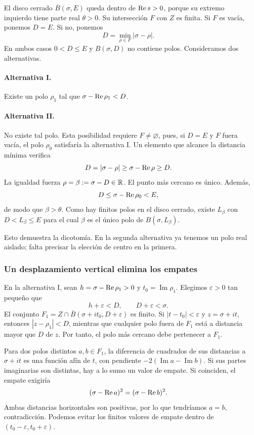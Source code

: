 El disco cerrado $\overline B(\sigma,E)$ queda dentro de $\operatorname{Re} s>0$,
porque su extremo izquierdo tiene parte real $\theta>0$.
Su intersección $F$ con $Z$ es finita. Si $F$ es vacía, ponemos $D=E$.
Si no, ponemos
\[
 D=\min_{\rho\in F}|\sigma-\rho|.
\]
En ambos casos $0<D\le E$ y $B(\sigma,D)$ no contiene polos.
Consideramos dos alternativas.

\paragraph{Alternativa I.}
Existe un polo $\rho_1$ tal que $\sigma-\operatorname{Re}\rho_1<D$.

\paragraph{Alternativa II.}
No existe tal polo. Esta posibilidad requiere $F\ne\varnothing$, pues,
si $D=E$ y $F$ fuera vacía, el polo $\rho_0$ satisfaría la alternativa I.
Un elemento que alcance la distancia mínima verifica
\[
 D=|\sigma-\rho|\ge\sigma-\operatorname{Re}\rho\ge D.
\]
La igualdad fuerza $\rho=\beta:=\sigma-D\in\mathbb{R}$.
El punto más cercano es único. Además,
\[
 D\le\sigma-\operatorname{Re}\rho_0<E,
\]
de modo que $\beta>\theta$. Como hay finitos polos en el disco cerrado,
existe $L_\beta$ con $D<L_\beta\le E$ para el cual $\beta$ es el único
polo de $B(\sigma,L_\beta)$.

Esto demuestra la dicotomía. En la segunda alternativa ya tenemos un
polo real aislado; falta precisar la elección de centro en la primera.

\subsubsection*{Un desplazamiento vertical elimina los empates}

En la alternativa I, sean $h=\sigma-\operatorname{Re}\rho_1>0$ y
$t_0=\operatorname{Im}\rho_1$. Elegimos $\varepsilon>0$ tan pequeño que
\[
 h+\varepsilon<D,\qquad D+\varepsilon<\sigma.
\]
El conjunto $F_1=Z\cap\overline B(\sigma+it_0,D+\varepsilon)$ es finito.
Si $|t-t_0|<\varepsilon$ y $z=\sigma+it$, entonces $|z-\rho_1|<D$,
mientras que cualquier polo fuera de $F_1$ está a distancia mayor que
$D$ de $z$. Por tanto, el polo más cercano debe pertenecer a $F_1$.

Para dos polos distintos $a,b\in F_1$, la diferencia de cuadrados de sus
distancias a $\sigma+it$ es una función afín de $t$, con pendiente
$-2(\operatorname{Im}a-\operatorname{Im}b)$.
Si sus partes imaginarias son distintas, hay a lo sumo un valor de
empate. Si coinciden, el empate exigiría
\[
 (\sigma-\operatorname{Re} a)^2=(\sigma-\operatorname{Re} b)^2.
\]
Ambas distancias horizontales son positivas, por lo que tendríamos
$a=b$, contradicción. Podemos evitar los finitos valores de empate
dentro de $(t_0-\varepsilon,t_0+\varepsilon)$.

